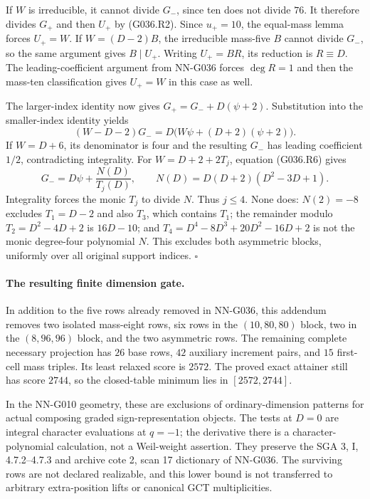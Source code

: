 If $W$ is irreducible, it cannot divide $G_-$,
since ten does not divide $76$.
It therefore divides $G_+$ and then $U_+$ by
(G036.R2). Since $u_+=10$, the equal-mass lemma
forces $U_+=W$.
If $W=(D-2)B$, the irreducible mass-five $B$ cannot
divide $G_-$, so the same argument gives $B\mid U_+$.
Writing $U_+=BR$, its reduction is $R\equiv D$.
The leading-coefficient argument from NN-G036 forces
$\deg R=1$ and then the mass-ten classification gives
$U_+=W$ in this case as well.

The larger-index identity now gives
$G_+=G_-+D(\psi+2)$.
Substitution into the smaller-index identity yields
\[
 (W-D-2)G_-=D\bigl(W\psi+(D+2)(\psi+2)\bigr).       \tag{G036.R6}
\]
If $W=D+6$, its denominator is four and the resulting
$G_-$ has leading coefficient $1/2$, contradicting
integrality.
For $W=D+2+2T_j$, equation (G036.R6) gives
\[
 G_-=D\psi+\frac{N(D)}{T_j(D)},\qquad
 N(D)=D(D+2)(D^2-3D+1).
\]
Integrality forces the monic $T_j$ to divide $N$.
Thus $j\le4$. None does:
$N(2)=-8$ excludes $T_1=D-2$ and also $T_3$,
which contains $T_1$;
the remainder modulo $T_2=D^2-4D+2$ is $16D-10$;
and $T_4=D^4-8D^3+20D^2-16D+2$ is not the
monic degree-four polynomial $N$.
This excludes both asymmetric blocks, uniformly
over all original support indices.
\hfill$\square$

\paragraph{The resulting finite dimension gate.}
In addition to the five rows already removed in
NN-G036, this addendum removes two isolated mass-eight
rows, six rows in the $(10,80,80)$ block, two in the
$(8,96,96)$ block, and the two asymmetric rows.
The remaining complete necessary projection has
$26$ base rows, $42$ auxiliary increment pairs,
and $15$ first-cell mass triples. Its least relaxed
score is $2572$. The proved exact attainer still
has score $2744$, so the closed-table minimum lies
in $[2572,2744]$.

In the NN-G010 geometry, these are exclusions of
ordinary-dimension patterns for actual composing
graded sign-representation objects. The tests at
$D=0$ are integral character evaluations at $q=-1$;
the derivative there is a character-polynomial
calculation, not a Weil-weight assertion.
They preserve the SGA 3, I, 4.7.2--4.7.3 and
archive cote 2, scan 17 dictionary of NN-G036.
The surviving rows are not declared realizable,
and this lower bound is not transferred to arbitrary
extra-position lifts or canonical GCT multiplicities.


